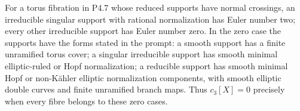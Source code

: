 \begin{proposition}[P4.8]\hypertarget{tag-02Y0}{}\label{night:P4.8}\label{stmt:P4.8}

For a torus fibration in P4.7 whose reduced supports have normal
crossings, an irreducible singular support with
rational normalization has Euler number two; every other irreducible
support has Euler number zero. In the zero case the supports have the
forms stated in the prompt: a smooth support has a finite unramified
torus cover; a singular irreducible support has smooth minimal
elliptic-ruled or Hopf normalization; a reducible support has smooth
minimal Hopf or non-Kähler elliptic normalization components, with
smooth elliptic double curves and finite unramified branch maps.
Thus $c_3[X]=0$ precisely when every fibre belongs to these zero cases.
\end{proposition}
